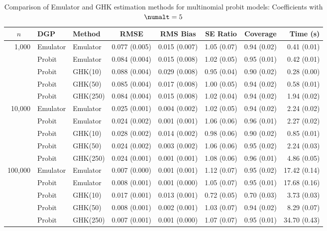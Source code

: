 \begin{table}[htbp]
\centering
\footnotesize
\begin{tabular}{@{}rllrrrrr@{}}
\toprule
\multicolumn{1}{c}{$n$} & \multicolumn{1}{l}{DGP} & \multicolumn{1}{l}{Method} & \multicolumn{1}{c}{RMSE} & \multicolumn{1}{c}{RMS Bias} & \multicolumn{1}{c}{SE Ratio} & \multicolumn{1}{c}{Coverage} & \multicolumn{1}{r}{Time (s)} \\
\midrule
\multirow{5}{*}{1,000} & Emulator & Emulator & 0.077 (0.005) & 0.015 (0.007) & 1.05 (0.07) & 0.94 (0.02) & 0.41 (0.01) \\
 & Probit & Emulator & 0.084 (0.004) & 0.015 (0.008) & 1.02 (0.05) & 0.95 (0.01) & 0.42 (0.01) \\
 & Probit & GHK(10) & 0.088 (0.004) & 0.029 (0.008) & 0.95 (0.04) & 0.90 (0.02) & 0.28 (0.00) \\
 & Probit & GHK(50) & 0.085 (0.004) & 0.017 (0.008) & 1.00 (0.05) & 0.94 (0.02) & 0.58 (0.01) \\
 & Probit & GHK(250) & 0.084 (0.004) & 0.015 (0.008) & 1.02 (0.04) & 0.94 (0.02) & 1.94 (0.02) \\
\midrule
\multirow{5}{*}{10,000} & Emulator & Emulator & 0.025 (0.001) & 0.004 (0.002) & 1.02 (0.05) & 0.94 (0.02) & 2.24 (0.02) \\
 & Probit & Emulator & 0.024 (0.002) & 0.001 (0.001) & 1.06 (0.06) & 0.96 (0.01) & 2.27 (0.02) \\
 & Probit & GHK(10) & 0.028 (0.002) & 0.014 (0.002) & 0.98 (0.06) & 0.90 (0.02) & 0.85 (0.01) \\
 & Probit & GHK(50) & 0.024 (0.002) & 0.003 (0.002) & 1.06 (0.06) & 0.95 (0.02) & 2.24 (0.03) \\
 & Probit & GHK(250) & 0.024 (0.001) & 0.001 (0.001) & 1.08 (0.06) & 0.96 (0.01) & 4.86 (0.05) \\
\midrule
\multirow{5}{*}{100,000} & Emulator & Emulator & 0.007 (0.000) & 0.001 (0.001) & 1.12 (0.07) & 0.95 (0.02) & 17.42 (0.14) \\
 & Probit & Emulator & 0.008 (0.001) & 0.001 (0.000) & 1.05 (0.07) & 0.95 (0.01) & 17.68 (0.16) \\
 & Probit & GHK(10) & 0.017 (0.001) & 0.013 (0.001) & 0.72 (0.05) & 0.70 (0.03) & 3.73 (0.03) \\
 & Probit & GHK(50) & 0.008 (0.001) & 0.002 (0.001) & 1.03 (0.07) & 0.94 (0.02) & 8.29 (0.07) \\
 & Probit & GHK(250) & 0.007 (0.001) & 0.001 (0.000) & 1.07 (0.07) & 0.95 (0.01) & 34.70 (0.43) \\
\bottomrule
\end{tabular}
\caption{Comparison of Emulator and GHK estimation methods for multinomial probit models: Coefficients with $\numalt=5$}
\label{tab:emulator_vs_ghk:5:beta}
\end{table}